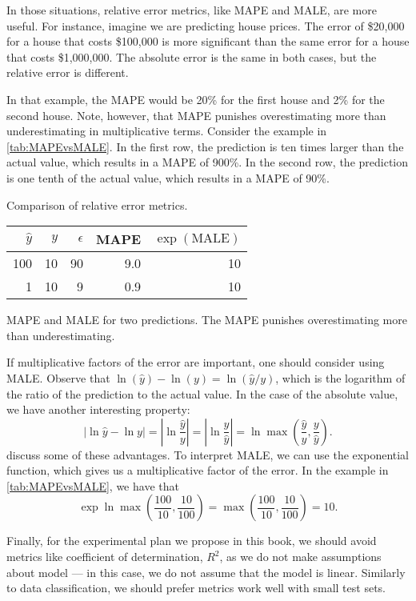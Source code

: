 In those situations, relative error metrics, like MAPE and MALE, are more useful.  For
instance, imagine we are predicting house prices.  The error of \$20,000
for a house that costs \$100,000 is more significant than the same error for a house that
costs \$1,000,000.  The absolute error is the same in both cases, but the relative error
is different.

In that example, the MAPE would be 20\% for the first house and 2\% for the second house.
Note, however, that MAPE punishes overestimating more than underestimating in
multiplicative terms.  Consider the example in \cref{tab:MAPEvsMALE}.  In the first row,
the prediction is ten times larger than the actual value, which results in a MAPE of
900\%.  In the second row, the prediction is one tenth of the actual value, which results
in a MAPE of 90\%.

\begin{tablebox}[label=tab:MAPEvsMALE]{Comparison of relative error metrics.}
  \centering
  \begin{tabular}{r r r r r}
    \toprule
    $\hat{y}$ & $y$ & $\epsilon$ & MAPE & $\exp(\text{MALE})$ \\
    \midrule
    100 & 10 & 90 & 9.0 & 10 \\
      1 & 10 &  9 & 0.9 & 10 \\
    \bottomrule
  \end{tabular}
  \tcblower
  MAPE and MALE for two predictions.  The MAPE punishes overestimating more than
  underestimating.
\end{tablebox}

If multiplicative factors of the error are important, one should consider using MALE.
Observe that $\ln(\hat{y}) - \ln(y) = \ln(\hat{y}/y)$, which is the logarithm of the
ratio of the prediction to the actual value.  In the case of the absolute value, we have
another interesting property: \[
  |\ln\hat{y} - \ln y| =
    |\ln\frac{\hat{y}}{y}| =
    |\ln\frac{y}{\hat{y}}| =
    \ln\max\left(\frac{\hat{y}}{y}, \frac{y}{\hat{y}}\right)\text{.}
\]
\textcite{Tofallis2015} discuss some of these advantages.  To
interpret MALE, we can use the exponential function, which gives us a multiplicative
factor of the error.  In the example in \cref{tab:MAPEvsMALE}, we have that \[
  \exp\ln\max\left(\frac{100}{10}, \frac{10}{100}\right) =
    \max\left(\frac{100}{10}, \frac{10}{100}\right) = 10\text{.}
\]

Finally, for the experimental plan we propose in this book, we should avoid metrics like
coefficient of determination, $R^2$, as we do not make assumptions about model --- in this
case, we do not assume that the model is linear.  Similarly to data classification, we
should prefer metrics work well with small test sets.

